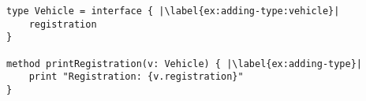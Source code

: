 \begin{lstlisting}[label={ex:vehicle},caption={Adding a type annotation to a method parameter.},escapechar=|,columns=flexible,float,floatplacement=H]
type Vehicle = interface { |\label{ex:adding-type:vehicle}|
    registration    
}

method printRegistration(v: Vehicle) { |\label{ex:adding-type}|
    print "Registration: {v.registration}"
}
\end{lstlisting}






